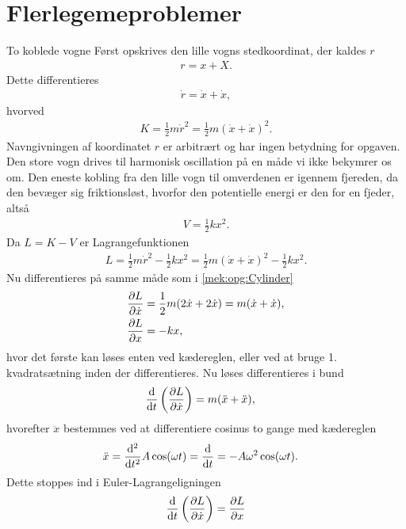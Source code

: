 \documentclass[crop=false, class=memoir]{standalone}
\begin{document}
\section*{Flerlegemeproblemer}
%
%
\begin{opgave}[2]{To koblede vogne}
%
\opg Først opskrives den lille vogns stedkoordinat, der kaldes $r$
%
\begin{align*}
	r = x + X.
\end{align*}
%
Dette differentieres
%
\begin{align*}
	\dot{r} = \dot{x} + \dot{x},
\end{align*}
%
hvorved
%
\begin{align*}
	K = \frac{1}{2}m\dot{r}^2 = \frac{1}{2}m(\dot{x} + \dot{x})^2.
\end{align*}
%
Navngivningen af koordinatet $r$ er arbitrært og har ingen betydning for opgaven.
%
\opg Den store vogn drives til harmonisk oscillation på en måde vi ikke bekymrer os om. Den eneste kobling fra den lille vogn til omverdenen er igennem fjereden, da den bevæger sig friktionsløst, hvorfor den potentielle energi er den for en fjeder, altså
%
\begin{align*}
	V = \frac{1}{2}kx^2.
\end{align*}
%
Da $L = K - V$ er Lagrangefunktionen
%
\begin{align*}
	L = \frac{1}{2}m\dot{r}^2 - \frac{1}{2}kx^2 = \frac{1}{2}m(\dot{x} + \dot{x})^2 - \frac{1}{2}kx^2.
\end{align*}
%
\opg Nu differentieres på samme måde som i \cref{mek:opg:Cylinder}
%
\begin{align*}
	\pdv{L}{\dot{x}} &= \frac{1}{2}m(2\dot{x} + 2\dot{x}) = m(\dot{x} + \dot{x}), \\
	\pdv{L}{x} &= -kx,
\end{align*}
%
hvor det første kan løses enten ved kædereglen, eller ved at bruge 1. kvadratsætning inden der differentieres.
%
\opg Nu løses differentieres i bund
%
\begin{align*}
	\dv{}{t}\left(\pdv{L}{\dot{x}}\right) &= m(\ddot{x} + \ddot{x}),
\end{align*}
%
hvorefter $\ddot{x}$ bestemmes ved at differentiere cosinus to gange med kædereglen
%
\begin{align*}
	\ddot{x} &= \dv[2]{}{t}A\cos(\omega t) = \dv{}{t}(-A\omega\sin(\omega t)) = -A\omega^2\cos(\omega t).
\end{align*}
%
Dette stoppes ind i Euler-Lagrangeligningen
%
\begin{align*}
	\el{x} &= \pdv{L}{x} \\

\end{align*}
\end{opgave}
\end{document}
